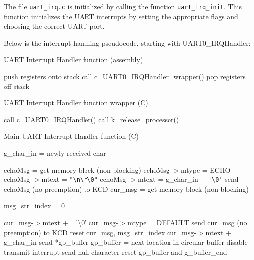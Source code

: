 \documentclass[12pt]{report}
\begin{document}
The file \texttt{uart_irq.c} is initialized by calling the function \texttt{uart_irq_init}. This function initializes the UART interrupts by setting the appropriate flags and choosing the correct UART port.

Below is the interrupt handling pseudocode, starting with UART0_IRQHandler:
\begin{algorithm}[H]
	\caption{UART Interrupt Handler function (assembly)}
	\begin{algorithmic}[1]
	    \State push registers onto stack
	    \State call c_UART0_IRQHandler_wrapper()
	    \State pop registers off stack
	  \EndFunction
	\end{algorithmic}
\end{algorithm}

\begin{algorithm}[H]
	\caption{UART Interrupt Handler function wrapper (C)}
	\begin{algorithmic}[1]
	    \State call c_UART0_IRQHandler()
	      \State call k_release_processor()
	    \EndIf
	  \EndFunction
	\end{algorithmic}
\end{algorithm}

\begin{algorithm}[H]
	\caption{Main UART Interrupt Handler function (C)}
	\begin{algorithmic}[1]
	      \State g_char_in = newly received char
	        \State\Return
	      \EndIf

	      \State echoMsg = get memory block (non blocking)
	        \State echoMsg-$>$mtype = ECHO
	          \State echoMsg-$>$mtext = \verb|"\n\r\0"|
	        \Else
	          \State echoMsg-$>$mtext = g_char_in + \verb|'\0'|
	        \EndIf
	        \State send echoMsg (no preemption) to KCD
	      \EndIf
	        \State cur_msg = get memory block (non blocking)
	          \State\Return
	        \EndIf

	        \State msg_str_index = 0
	      \EndIf

	        \State cur_msg-$>$mtext += '\textbackslash 0'
	        \State cur_msg-$>$mtype = DEFAULT
	        \State send cur_msg (no preemption) to KCD
	        \State reset cur_msg, msg_str_index
	      \Else
	        \State cur_msg-$>$mtext += g_char_in
	      \EndIf
	        \State send *gp_buffer
	        \State gp_buffer = next location in circular buffer
	      \Else
	        \State disable transmit interrupt
	        \State send null character
	        \State reset gp_buffer and g_buffer_end
	      \EndIf
	    \EndIf
	  \EndFunction
	\end{algorithmic}
\end{algorithm}
\end{document}
